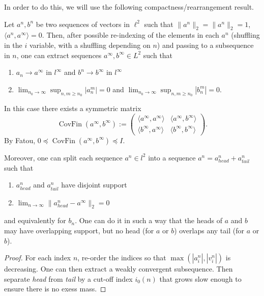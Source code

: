 \documentclass{inprogress}
\begin{document}
In order to do this, we will use the following compactness/rearrangement result.
\newcommand{\CovFin}{\operatorname{CovFin}}
\begin{lemma}\label{compactness_rearrangement}
    Let $a^n,b^n$ be two sequences of vectors in $\ell^2$ such that $\|a^n\|_2 = \|a^n\|_2 = 1$, $\langle a^n, a^\infty \rangle = 0$. Then, after possible re-indexing of the elements in each $a^n$ (shuffling in the $i$ variable, with a shuffling depending on $n$) and passing to a subsequence in $n$, one can extract sequences  $a^\infty, b^\infty \in L^2$ such that 
    \begin{enumerate}
        \item $a_n \to a^\infty$ in $l^{\infty}$ and $b^n \to b^\infty$ in $l^\infty$
        \item $\lim_{n_0\to\infty} \sup_{n,m\ge n_0} |a_n^m| = 0$ and $\lim_{n_0\to\infty} \sup_{n,m\ge n_0} |b_n^m| = 0$.
    \end{enumerate}
    In this case there exists a symmetric matrix 
    $$\CovFin(a^\infty, b^\infty):= \begin{pmatrix} \langle a^\infty, a^\infty \rangle & \langle a^\infty, b^\infty \rangle \\ \langle b^\infty, a^\infty \rangle & \langle b^\infty, b^\infty \rangle \end{pmatrix}.$$
    By Fatou, $0\preceq \CovFin(a^\infty, b^\infty) \preceq I$.

    Moreover, one can split each sequence $a^n \in l^2$ into a sequence $a^{n} = a^n_{head}+a^n_{tail}$ such that
    \begin{enumerate}
        \item $a^n_{head}$ and $a^n_{tail}$ have disjoint support
        \item $\lim_{n\to\infty} \|a^n_{head}-a^{\infty}\|_{2} = 0$
    \end{enumerate}
    and equivalently for $b_n$. One can do it in such a way that the heads of $a$ and $b$  may have overlapping support, but no head (for $a$ or $b$) overlaps any tail (for $a$ or $b$).
\end{lemma}

\begin{proof}
    For each index $n$, re-order the indices so that $\max (|a_i^n|,|v_i^n|)$ is decreasing. One can then extract a weakly convergent subsequence.
    Then separate \emph{head} from \emph{tail} by a cut-off index $i_0(n)$ that grows slow enough to ensure there is no exess mass.
\end{proof}
\end{document}
